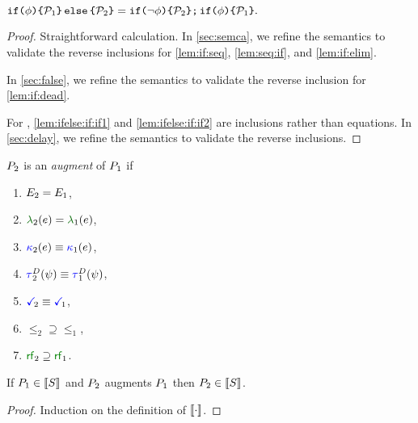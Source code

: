 \begin{lemma}
\begin{enumerate*}[label=(\alph*),ref=\alph*]
  \\\item
    \begin{math} \label{lem:ifelse:if:if2}
      \xIFTHEN{\aForm}{\aPSS_1}{\aPSS_2}
      =
      \xSEMI{
        \xIFTHEN{\lnot\aForm}{\aPSS_2}{}
      }{
        \xIFTHEN{\aForm}{\aPSS_1}{}
      }.
    \end{math}
  \end{enumerate*}      
  \vspace{-.5\baselineskip}
  \begin{proof}
    Straightforward calculation.
    In \textsection\ref{sec:semca}, we refine the semantics to validate the
    reverse inclusions for \eqref{lem:if:seq}, \eqref{lem:seq:if}, and
    \eqref{lem:if:elim}.

    In \textsection\ref{sec:false}, we refine the semantics to validate the
    reverse inclusion for \eqref{lem:if:dead}.

    For \PwP, \eqref{lem:ifelse:if:if1} and \eqref{lem:ifelse:if:if2}
    are inclusions rather than equations.  In \textsection\ref{sec:delay}, we
    refine the semantics to validate the reverse inclusions.    
  \end{proof}
\end{lemma}
\begin{definition}
  \label{def:augment}
  $P_2$ is an \emph{augment} of $P_1$ if
  \begin{multicols}{4}
    \begin{enumerate}
    \item $E_2=E_1$,
    \item $\labelingAct_2(\aEv)=\labelingAct_1(\aEv)$,
    \item ${\color{blue}\kappa}_2(e) \mathrel{\equiv} {\color{blue}\kappa}_1(e)$,
    \item $\aTr[2]{\bEvs}{\bForm}\riff \aTr[1]{\bEvs}{\bForm}$,
    \item $\aTerm[2] \riff \aTerm[1]$,
    \item ${\le_2}\supseteq{\le_1}$,
    \item ${\rrfx_2}\supseteq{\rrfx_1}$.
    \end{enumerate}
  \end{multicols}
\end{definition}
\begin{lemma}
  If $\aPS_1\in\sembase{\aCmd}$ and $P_2$  augments $P_1$ then $\aPS_2\in\sembase{\aCmd}$.

  \vspace{-.5\baselineskip}
  \begin{proof}
    Induction on the definition of $\sembase{}$.
  \end{proof}
\end{lemma}





